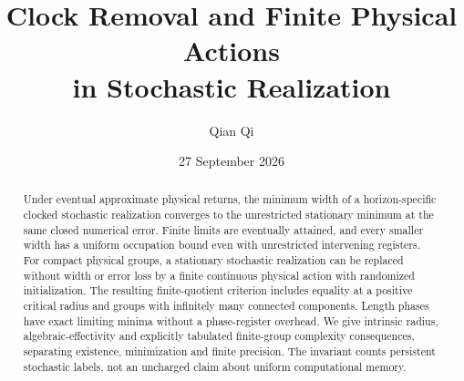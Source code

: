 \documentclass[11pt]{amsart}
\title[Clock removal and finite physical actions]{Clock Removal and Finite Physical Actions\\in Stochastic Realization}
\author{Qian Qi}
\date{27 September 2026}
\numberwithin{equation}{section}
\theoremstyle{definition}\newtheorem{definition}[theorem]{Definition}
\theoremstyle{remark}\newtheorem{remark}[theorem]{Remark}
\begin{document}
\begin{abstract}
Under eventual approximate physical returns, the minimum width of a
horizon-specific clocked stochastic realization converges to the
unrestricted stationary minimum at the same closed numerical error.
Finite limits are eventually attained, and every smaller width has a
uniform occupation bound even with unrestricted intervening registers.
For compact physical groups, a stationary stochastic realization can be
replaced without width or error loss by a finite continuous physical
action with randomized initialization. The resulting finite-quotient
criterion includes equality at a positive critical radius and groups
with infinitely many connected components. Length phases have exact
limiting minima without a phase-register overhead. We give intrinsic
radius, algebraic-effectivity and explicitly tabulated finite-group
complexity consequences, separating existence, minimization and finite
precision. The invariant counts persistent stochastic labels, not an
uncharged claim about uniform computational memory.
\end{abstract}
\maketitle













\end{document}
